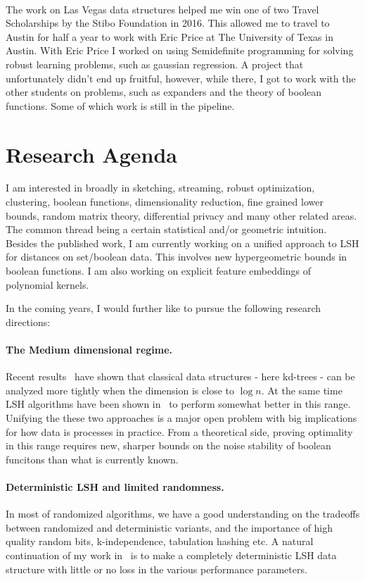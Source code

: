 \documentclass[10pt]{article}
\begin{document}
\paragraph{}
The work on Las Vegas data structures helped me win one of two Travel Scholarships by the Stibo Foundation in 2016.
This allowed me to travel to Austin for half a year to work with Eric Price at The University of Texas in Austin.
With Eric Price I worked on using Semidefinite programming for solving robust learning problems, such as gaussian regression.
A project that unfortunately didn’t end up fruitful, however, while there, I got to work with the other students on problems, such as expanders and the theory of boolean functions.
Some of which work is still in the pipeline.

\section{Research Agenda}

I am interested in broadly in sketching, streaming, robust optimization, clustering, boolean functions, dimensionality reduction, fine grained lower bounds, random matrix theory, differential privacy and many other related areas.
The common thread being a certain statistical and/or geometric intuition.
Besides the published work, I am currently working on a unified approach to LSH for distances on set/boolean data. This involves new hypergeometric bounds in boolean functions. I am also working on explicit feature embeddings of polynomial kernels.

In the coming years, I would further like to pursue the following research directions:

\paragraph{The Medium dimensional regime.} Recent results~\cite{DBLP:conf/compgeom/Chan17a} have shown that classical data structures - here kd-trees - can be analyzed more tightly when the dimension is close to $\log n$.
At the same time LSH algorithms have been shown in~\cite{becker2016new} to perform somewhat better in this range.
Unifying the these two approaches is a major open problem with big implications for how data is processes in practice.
From a theoretical side, proving optimality in this range requires new, sharper bounds on the noise stability of boolean funcitons than what is currently known.

\paragraph{Deterministic LSH and limited randomness.} In most of randomized algorithms, we have a good understanding on the tradeoffs between randomized and deterministic variants, and the importance of high quality random bits, k-independence, tabulation hashing etc.
A natural continuation of my work in~\cite{ahle2017optimal} is to make a completely deterministic LSH data structure with little or no loss in the various performance parameters.
\end{document}
